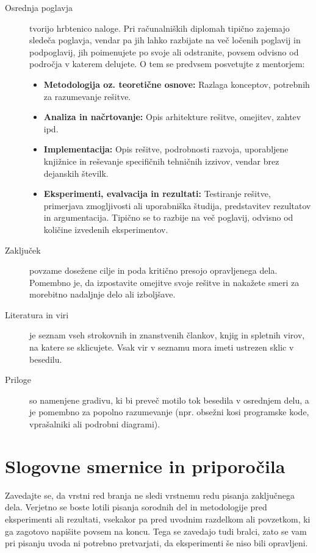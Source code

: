\documentclass[a4paper,12pt,openright]{book}
\begin{document}
\begin{description}
    \item[Osrednja poglavja] tvorijo hrbtenico naloge. Pri računalniških diplomah tipično zajemajo sledeča poglavja, vendar pa jih lahko razbijate na več ločenih poglavij in podpoglavij, jih poimenujete po svoje ali odstranite, povsem odvisno od področja v katerem delujete. O tem se predvsem posvetujte z mentorjem:
    \begin{itemize}
        \item \textbf{Metodologija oz. teoretične osnove:} Razlaga konceptov, potrebnih za razumevanje rešitve.
        \item \textbf{Analiza in načrtovanje:} Opis arhitekture rešitve, omejitev, zahtev ipd.
        \item \textbf{Implementacija:} Opis rešitve, podrobnosti razvoja, uporabljene knjižnice in reševanje specifičnih tehničnih izzivov, vendar brez dejanskih številk.
        \item \textbf{Eksperimenti, evalvacija in rezultati:} Testiranje rešitve, primerjava zmogljivosti ali uporabniška študija, predstavitev rezultatov in argumentacija. Tipično se to razbije na več poglavij, odvisno od količine izvedenih eksperimentov.
    \end{itemize}
    
    \item[Zaključek] povzame dosežene cilje in poda kritično presojo opravljenega dela. Pomembno je, da izpostavite omejitve svoje rešitve in nakažete smeri za morebitno nadaljnje delo ali izboljšave.
    
    \item[Literatura in viri] je seznam vseh strokovnih in znanstvenih člankov, knjig in spletnih virov, na katere se sklicujete. Vsak vir v seznamu mora imeti ustrezen sklic v besedilu.
    
    \item[Priloge] so namenjene gradivu, ki bi preveč motilo tok besedila v osrednjem delu, a je pomembno za popolno razumevanje (npr. obsežni kosi programske kode, vprašalniki ali podrobni diagrami).
\end{description}

\section{Slogovne smernice in priporočila}

Zavedajte se, da vrstni red branja ne sledi vrstnemu redu pisanja zaključnega dela. Verjetno se boste lotili pisanja sorodnih del in metodologije pred eksperimenti ali rezultati, vsekakor pa pred uvodnim razdelkom ali povzetkom, ki ga zagotovo napišite povsem na koncu. Tega se zavedajo tudi bralci, zato se vam pri pisanju uvoda ni potrebno pretvarjati, da eksperimenti še niso bili opravljeni.
\end{document}
